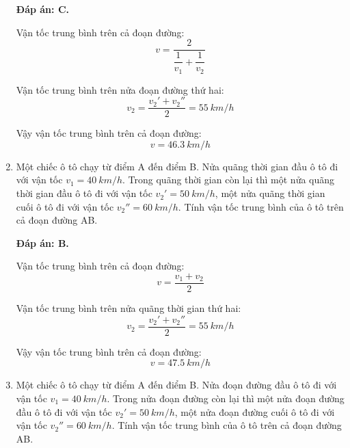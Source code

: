 \begin{enumerate}[label=\bfseries Câu \arabic*:]
{	}
	
	\hideall
	{\textbf{Đáp án: C.}
		
		Vận tốc trung bình trên cả đoạn đường:
		$$v=\dfrac{2}{\dfrac{1}{v_1}+\dfrac{1}{v_2}}$$
		
		Vận tốc trung bình trên nửa đoạn đường thứ hai:
		$$v_2=\dfrac{v_2'+v_2''}{2} = \SI{55}{km/h}$$
		
		Vậy vận tốc trung bình trên cả đoạn đường:
		$$v=\SI{46.3}{km/h}$$
	}
	\item {}
	
	
	{Một chiếc ô tô chạy từ điểm A đến điểm B. Nửa quãng thời gian đầu ô tô đi với vận tốc $v_1=\SI{40}{km/h}$. Trong quãng thời gian còn lại thì một nửa quãng thời gian đầu ô tô đi với vận tốc $v_2'=\SI{50}{km/h}$, một nửa quãng thời gian cuối ô tô đi với vận tốc $v_2''=\SI{60}{km/h}$. Tính vận tốc trung bình của ô tô trên cả đoạn đường AB. 
		
		
	}
	
	\hideall
	{\textbf{Đáp án: B.}
		
		Vận tốc trung bình trên cả đoạn đường:
		$$v=\dfrac{v_1+v_2}{2}$$
		
		Vận tốc trung bình trên nửa quãng thời gian thứ hai:
		$$v_2=\dfrac{v_2'+v_2''}{2} = \SI{55}{km/h}$$
		
		Vậy vận tốc trung bình trên cả đoạn đường:
		$$v=\SI{47.5}{km/h}$$
	}
	\item {}
	
	
	{Một chiếc ô tô chạy từ điểm A đến điểm B. Nửa đoạn đường đầu ô tô đi với vận tốc $v_1=\SI{40}{km/h}$. Trong nửa đoạn đường còn lại thì một nửa đoạn đường đầu ô tô đi với vận tốc $v_2'=\SI{50}{km/h}$, một nửa đoạn đường cuối ô tô đi với vận tốc $v_2''=\SI{60}{km/h}$. Tính vận tốc trung bình của ô tô trên cả đoạn đường AB. 
		
		
}
\end{enumerate}
